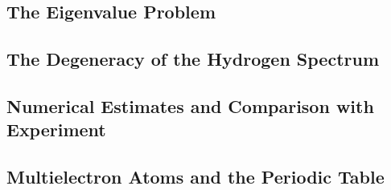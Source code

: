 \subsection{The Eigenvalue Problem}

\subsection{The Degeneracy of the Hydrogen Spectrum}

\subsection{Numerical Estimates and Comparison with Experiment}

\subsection{Multielectron Atoms and the Periodic Table}
